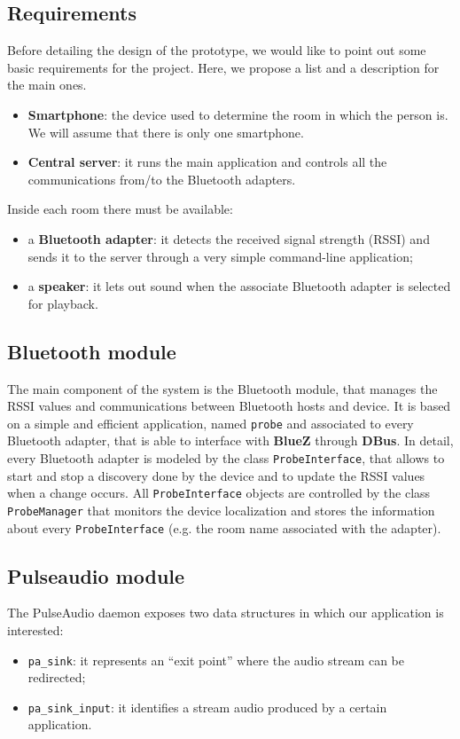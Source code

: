 \documentclass[conference]{IEEEtran}
\begin{document}
\subsection{Requirements}
Before detailing the design of the prototype, we would like to point out some basic requirements for the project. Here, we propose a list and a description for the main ones.
\begin{itemize}
\item{\textbf{Smartphone}:} the device used to determine the room in which the person is. We will assume that there is only one smartphone.
\item{\textbf{Central server}:} it runs the main application and controls all the communications from/to the Bluetooth adapters.
\end{itemize}
Inside each room there must be available:
\begin{itemize}
\item{a \textbf{Bluetooth adapter}:} it detects the received signal strength (RSSI) and sends it to the server through a very simple command-line application;
\item{a \textbf{speaker}:} it lets out sound when the associate Bluetooth adapter is selected for playback.
\end{itemize}

\subsection{Bluetooth module}
The main component of the system is the Bluetooth module, that manages the RSSI values and communications between Bluetooth hosts and device. It is based on a simple and efficient application, named \texttt{probe} and associated to every Bluetooth adapter, that is able to interface with \textbf{BlueZ} through \textbf{DBus}. In detail, every Bluetooth adapter is modeled by the class \texttt{ProbeInterface}, that allows to start and stop a discovery done by the device and to update the RSSI values when a change occurs. All \texttt{ProbeInterface} objects are controlled by the class \texttt{ProbeManager} that monitors the device localization and stores the information about every \texttt{ProbeInterface} (e.g. the room name associated with the adapter).

\subsection{Pulseaudio module}
The PulseAudio daemon exposes two data structures in which our application is interested:
\begin{itemize}
\item \texttt{pa\_sink}: it represents an ``exit point'' where the audio stream can be redirected;
\item \texttt{pa\_sink\_input}: it identifies a stream audio produced by a certain application.
\end{itemize}
\end{document}
